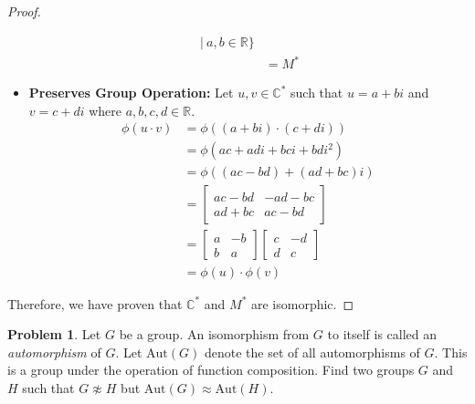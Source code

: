 \documentclass[12pt,reqno]{article}
\newcommand{\R}{\mathbb{R}}
\newcommand{\C}{\mathbb{C}}
\theoremstyle{plain}
\theoremstyle{definition}
\newtheorem{problem}{Problem}
\begin{document}
\begin{proof}
\begin{itemize}
\begin{align*}
                \ \bigg|\ a,b\in\R
            \biggr\}\\
            &= M^*
        \end{align*}
    \item \textbf{Preserves Group Operation: } Let \(u,v\in\C^*\) such that \(u=a+bi\) and \(v=c+di\) where \(a,b,c,d\in\R\).
    \begin{align*}
        \phi(u\cdot v) &= \phi((a+bi)\cdot (c+di))\\
        &= \phi(ac+adi+bci+bdi^2)\\
        &= \phi((ac-bd)+(ad+bc)i)\\
        &= \begin{bmatrix}
            ac-bd & -ad-bc\\
            ad+bc & ac-bd
        \end{bmatrix}\\
        &= \begin{bmatrix}
            a & -b\\
            b & a
        \end{bmatrix}
        \begin{bmatrix}
            c & -d\\
            d & c
        \end{bmatrix}\\
        &= \phi(u)\cdot\phi(v)
    \end{align*}
    \end{itemize}
    Therefore, we have proven that \(\C^*\) and \(M^*\) are isomorphic.
\end{proof}

\newpage


\begin{problem} Let $G$ be a group. An isomorphism from $G$ to itself is called an \emph{automorphism} of $G$. Let $\mathrm{Aut}(G)$ denote the set of all automorphisms of $G$. This is a group under the operation of function composition.
    Find two groups $G$ and $H$ such that $G \not \approx H$ but $\mathrm{Aut}(G) \approx \mathrm{Aut}(H)$.
\end{problem}
\end{document}
